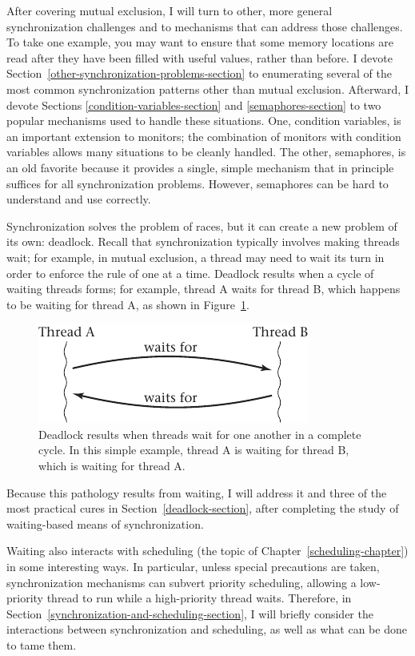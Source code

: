 After covering mutual exclusion, I will turn to other, more general
synchronization challenges and to mechanisms that can address those
challenges.  To take one example, you may want to ensure that some
memory locations are read after they have been filled with useful
values, rather than before.  I devote Section~\ref{other-synchronization-problems-section} to enumerating
several of the most common synchronization patterns other than mutual
exclusion.  Afterward, I devote
Sections \ref{condition-variables-section} and \ref{semaphores-section} to two popular
mechanisms used to handle these situations. One, condition variables,
is an important extension to monitors; the combination of monitors
with condition variables allows many situations to be cleanly handled.
The other, semaphores, is an old favorite because it provides a
single, simple mechanism that in principle suffices for all
synchronization problems.  However, semaphores can be hard to
understand and use correctly.

Synchronization solves the problem of races, but it can create a new
problem of its own: deadlock.  Recall that synchronization typically
involves making threads wait; for example, in mutual exclusion, a
thread may need to wait its turn in order to enforce the rule of one
at a time.  Deadlock results when a cycle of waiting threads forms;
for example, thread A waits for thread B, which happens to be waiting
for thread A, as shown in Figure~\ref{scan-4-2}.
\begin{figure}
\centerline{\includegraphics{hail_f0401}}
\caption{Deadlock results when threads wait for one another in a
  complete cycle.  In this simple example, thread A is waiting for
  thread B, which is waiting for thread A.}
\label{scan-4-2}
\end{figure}
Because this pathology results from waiting, I
will address it and three of the most practical cures in Section~\ref{deadlock-section}, after
completing the study of waiting-based means of synchronization.

Waiting also interacts with scheduling (the topic of
Chapter~\ref{scheduling-chapter}) in some interesting ways.  In particular, unless special
precautions are taken, synchronization mechanisms can subvert priority
scheduling, allowing a low-priority thread to run while a
high-priority thread waits.  Therefore, in
Section~\ref{synchronization-and-scheduling-section}, I will briefly consider the
interactions between synchronization and scheduling, as well as what can be
done to tame them.

